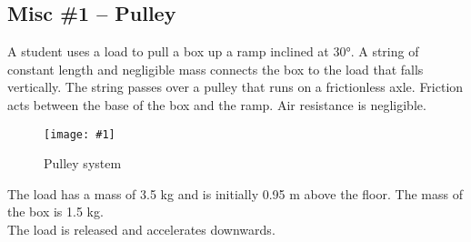 \documentclass[a4paper,12pt]{article}
\newcommand{\lb}{\\[8pt]}
\newcommand{\img}[4]{\begin{center}
  \begin{figure}[H]
    \centering
    \texttt{[image: \#1]}
    \caption{#3}
    \label{fig:#4}
  \end{figure}
\end{center}}
\begin{document}
\subsection{Misc \#1 -- Pulley}

A student uses a load to pull a box up a ramp inclined at 30°. A string of constant length and negligible mass connects the box to the load that falls vertically. The string passes over a pulley that runs on a frictionless axle. Friction acts between the base of the box and the ramp. Air resistance is negligible.

\img{ex/2.png}{0.7}{Pulley system}{pulley}

The load has a mass of 3.5 kg and is initially 0.95 m above the floor. The mass of the box is 1.5 kg.\lb
The load is released and accelerates downwards.
\end{document}
